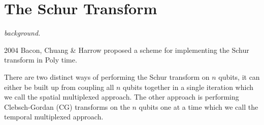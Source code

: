 \section{The Schur Transform}

\textit{background.}

2004 Bacon, Chuang \& Harrow proposed a scheme for implementing the Schur transform in Poly time. 

There are two distinct ways of performing the Schur transform on $n$ qubits, it can either be built up from coupling
all $n$ qubits together in a single iteration which we call the spatial multiplexed approach. The other approach is 
performing Clebsch-Gordan (CG) transforms on the $n$ qubits one at a time which we call the temporal multiplexed 
approach.  




